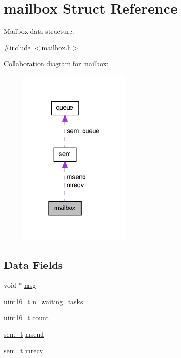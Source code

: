 \hypertarget{structmailbox}{\section{mailbox Struct Reference}
\label{structmailbox}
}


Mailbox data structure.  




{\ttfamily \#include $<$mailbox.\-h$>$}



Collaboration diagram for mailbox\-:\nopagebreak
\begin{figure}[H]
\begin{center}
\leavevmode
\includegraphics[width=159pt]{structmailbox__coll__graph}
\end{center}
\end{figure}
\subsection*{Data Fields}
\begin{DoxyCompactItemize}
\item 
void $\ast$ \hyperlink{structmailbox_a2568c0b3f722bca8beb8e85824806258}{msg}
\item 
uint16\-\_\-t \hyperlink{structmailbox_a7d31234908ebf91baf3dfbc8507f823e}{n\-\_\-waiting\-\_\-tasks}
\item 
uint16\-\_\-t \hyperlink{structmailbox_ae99432557a6663a6e7b43b27b4448c9c}{count}
\item 
\hyperlink{semaphore_8h_ad7630848c81d49708045a351922eb6b5}{sem\-\_\-t} \hyperlink{structmailbox_a061152c5d6eb8b70f1056c385c6cce73}{msend}
\item 
\hyperlink{semaphore_8h_ad7630848c81d49708045a351922eb6b5}{sem\-\_\-t} \hyperlink{structmailbox_aab51b97fffcc79e7398d8fadd8b0d3cb}{mrecv}
\end{DoxyCompactItemize}


